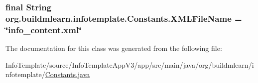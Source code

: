 \subsubsection[{\texorpdfstring{X\+M\+L\+File\+Name}{XMLFileName}}]{\setlength{\rightskip}{0pt plus 5cm}final String org.\+buildmlearn.\+infotemplate.\+Constants.\+X\+M\+L\+File\+Name = \char`\"{}info\+\_\+content.\+xml\char`\"{}\hspace{0.3cm}{\ttfamily [static]}}\hypertarget{classorg_1_1buildmlearn_1_1infotemplate_1_1Constants_a22968d39912d481f05334917ee2534a1}{}\label{classorg_1_1buildmlearn_1_1infotemplate_1_1Constants_a22968d39912d481f05334917ee2534a1}


The documentation for this class was generated from the following file\+:\begin{DoxyCompactItemize}
\item 
Info\+Template/source/\+Info\+Template\+App\+V3/app/src/main/java/org/buildmlearn/infotemplate/\hyperlink{InfoTemplate_2source_2InfoTemplateAppV3_2app_2src_2main_2java_2org_2buildmlearn_2infotemplate_2Constants_8java}{Constants.\+java}\end{DoxyCompactItemize}
